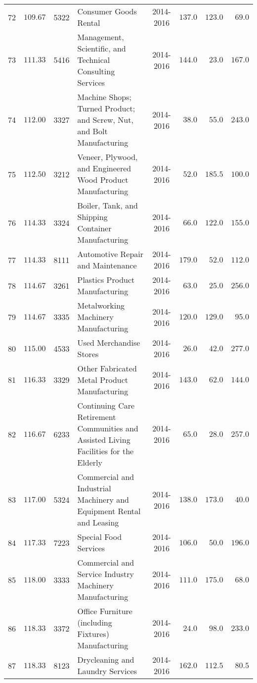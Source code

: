\documentclass[9pt, oneside]{article}   	%
\begin{document}
\begin{longtable}{cccp{2.0in}cccc}
72  & $109.67$ & 5322 & Consumer Goods Rental & 2014-2016 & $137.0$ & $123.0$ & $\phantom{0}69.0$ \\
73  & $111.33$ & 5416 & Management, Scientific, and Technical Consulting Services & 2014-2016 & $144.0$ & $\phantom{0}23.0$ & $167.0$ \\
74  & $112.00$ & 3327 & Machine Shops; Turned Product; and Screw, Nut, and Bolt Manufacturing & 2014-2016 & $\phantom{0}38.0$ & $\phantom{0}55.0$ & $243.0$ \\
75  & $112.50$ & 3212 & Veneer, Plywood, and Engineered Wood Product Manufacturing & 2014-2016 & $\phantom{0}52.0$ & $185.5$ & $100.0$ \\
76  & $114.33$ & 3324 & Boiler, Tank, and Shipping Container Manufacturing & 2014-2016 & $\phantom{0}66.0$ & $122.0$ & $155.0$ \\
77  & $114.33$ & 8111 & Automotive Repair and Maintenance & 2014-2016 & $179.0$ & $\phantom{0}52.0$ & $112.0$ \\
78  & $114.67$ & 3261 & Plastics Product Manufacturing & 2014-2016 & $\phantom{0}63.0$ & $\phantom{0}25.0$ & $256.0$ \\
79  & $114.67$ & 3335 & Metalworking Machinery Manufacturing & 2014-2016 & $120.0$ & $129.0$ & $\phantom{0}95.0$ \\
80  & $115.00$ & 4533 & Used Merchandise Stores & 2014-2016 & $\phantom{0}26.0$ & $\phantom{0}42.0$ & $277.0$ \\
81  & $116.33$ & 3329 & Other Fabricated Metal Product Manufacturing & 2014-2016 & $143.0$ & $\phantom{0}62.0$ & $144.0$ \\
82  & $116.67$ & 6233 & Continuing Care Retirement Communities and Assisted Living Facilities for the Elderly & 2014-2016 & $\phantom{0}65.0$ & $\phantom{0}28.0$ & $257.0$ \\
83  & $117.00$ & 5324 & Commercial and Industrial Machinery and Equipment Rental and Leasing & 2014-2016 & $138.0$ & $173.0$ & $\phantom{0}40.0$ \\
84  & $117.33$ & 7223 & Special Food Services & 2014-2016 & $106.0$ & $\phantom{0}50.0$ & $196.0$ \\
85  & $118.00$ & 3333 & Commercial and Service Industry Machinery Manufacturing & 2014-2016 & $111.0$ & $175.0$ & $\phantom{0}68.0$ \\
86  & $118.33$ & 3372 & Office Furniture (including Fixtures) Manufacturing & 2014-2016 & $\phantom{0}24.0$ & $\phantom{0}98.0$ & $233.0$ \\
87  & $118.33$ & 8123 & Drycleaning and Laundry Services & 2014-2016 & $162.0$ & $112.5$ & $\phantom{0}80.5$ \\

\end{longtable}
\end{document}
